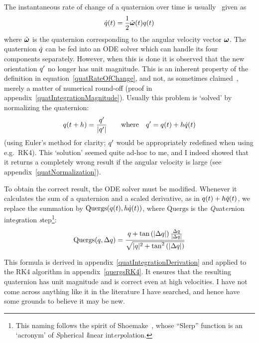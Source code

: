 The instantaneous rate of change of a quaternion  over time is
usually~\cite{BaraffWitkin:97,Eberly:04,Saunders:PhD} given as
\begin{equation}
\label{quatRateOfChange}
\dot{\q{q}}(t) = \frac{1}{2}\tilde{\ve{\omega}}(t)\q{q}(t)
\end{equation}
where $\tilde{\ve{\omega}}$ is the quaternion corresponding to the angular velocity
vector $\ve{\omega}$. The quaternion $\dot{q}$ can be fed into an ODE solver which can handle
its four components separately. However, when this is done it is observed that the new orientation
$q'$ no longer has unit magnitude. This is an inherent property of the definition in
equation~\ref{quatRateOfChange}, and not, as sometimes claimed~\cite{Eberly:04}, merely a matter
of numerical round-off (proof in appendix~\ref{quatIntegrationMagnitude}). Usually this problem
is `solved' by normalizing the quaternion:
\begin{equation}
q(t + h) = \frac{q'}{|q'|} \quad\quad\mathrm{where}\quad
    q' = q(t) + h\dot{q}(t)
\end{equation}
(using Euler's method for clarity; $q'$ would be appropriately redefined when using e.g.\ RK4).
This `solution' seemed quite ad-hoc to me, and I indeed showed that it returns a completely wrong
result if the angular velocity is large (see appendix~\ref{quatNormalization}).

To obtain the correct result, the ODE solver must be modified. Whenever it calculates the sum of
a quaternion and a scaled derivative, as in $q(t) + h\dot{q}(t)$, we replace the summation
by $\mathrm{Quergs}(q(t), h\dot{q}(t))$, where $\mathrm{Quergs}$ is the
\emph{Qu}at\emph{er}nion inte\emph{g}ration \emph{s}tep\footnote{This naming follows the spirit of
Shoemake~\cite{Shoemake:85}, whose ``Slerp'' function is an `acronym' of \emph{S}pherical
\emph{l}inear int\emph{erp}olation.}:
\begin{equation}
\label{quergs}
\mathrm{Quergs}(q, \Delta q) =
    \frac{q + \tan\left(|\Delta q|\right)
        \frac{\Delta q}{|\Delta q|}}{
    \sqrt{|q|^2 + \tan^2\left(|\Delta q|\right)}}
\end{equation}

This formula is derived in appendix~\ref{quatIntegrationDerivation} and applied to the RK4
algorithm in appendix~\ref{quergsRK4}. It ensures that the resulting quaternion has unit magnitude
and is correct even at high velocities. I have not come across anything like it in the literature
I have searched, and hence have some grounds to believe it may be new.
